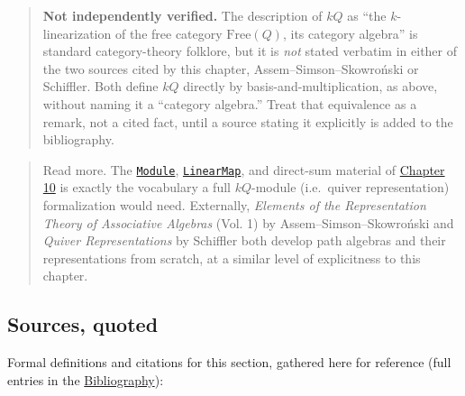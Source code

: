 \begin{quote}
\textbf{Not independently verified.} The description of \(kQ\) as ``the \(k\)-linearization of the free category \(\mathrm{Free}(Q)\), its category algebra'' is standard category-theory folklore, but it is \emph{not} stated verbatim in either of the two sources cited by this chapter, Assem--Simson--Skowroński or Schiffler. Both define \(kQ\) directly by basis-and-multiplication, as above, without naming it a ``category algebra.'' Treat that equivalence as a remark, not a cited fact, until a source stating it explicitly is added to the bibliography.
\end{quote}

\begin{quote}
Read more. The \href{https://loogle.lean-lang.org/?q=Module}{\texttt{Module}}, \href{https://loogle.lean-lang.org/?q=LinearMap}{\texttt{LinearMap}}, and direct-sum material of \hyperref[sec:10-modules:00-index:1]{Chapter 10} is exactly the vocabulary a full \(kQ\)-module (i.e.~quiver representation) formalization would need. Externally, \emph{Elements of the Representation Theory of Associative Algebras} (Vol. 1) by Assem--Simson--Skowroński and \emph{Quiver Representations} by Schiffler both develop path algebras and their representations from scratch, at a similar level of explicitness to this chapter.
\end{quote}

\subsection{Sources, quoted}\label{sec:11-path-algebras:05-path-composition:4}

Formal definitions and citations for this section, gathered here for reference (full entries in the \hyperref[sec:root:bibliography:1]{Bibliography}):

